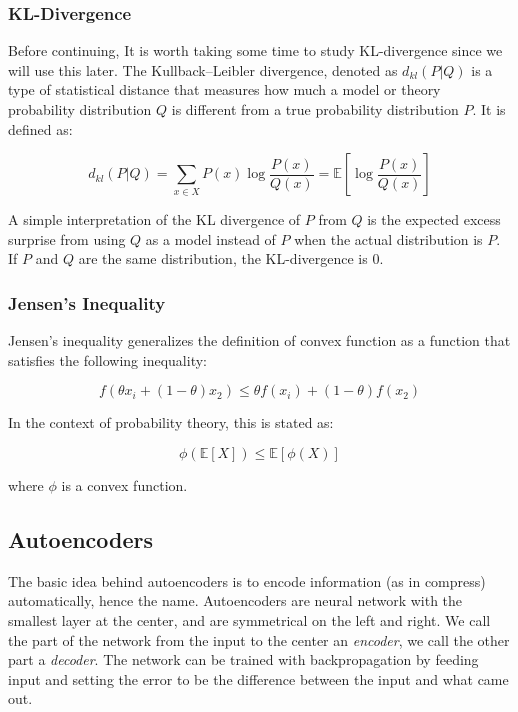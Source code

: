 \documentclass{article}
\begin{document}
\subsubsection{KL-Divergence}\label{kl-divergence}

Before continuing, It is worth taking some time to study KL-divergence
since we will use this later. The Kullback--Leibler divergence, denoted
as \(d_{kl}(P|Q)\) is a type of statistical distance that measures how
much a model or theory probability distribution \(Q\) is different from
a true probability distribution \(P\). It is defined as:

\[d_{kl}(P|Q)=\sum_{x\in X}P(x)\log \frac{P(x)}{Q(x)}=\mathbb{E}[\log \frac{P(x)}{Q(x)}]\]

A simple interpretation of the KL divergence of \(P\) from \(Q\) is the
expected excess surprise from using \(Q\) as a model instead of \(P\)
when the actual distribution is \(P\). If \(P\) and \(Q\) are the same
distribution, the KL-divergence is \(0\).

\subsubsection{Jensen's Inequality}\label{jensens-inequality}

Jensen's inequality generalizes the definition of convex function as a
function that satisfies the following inequality:

\[f(\theta x_i + (1-\theta)x_2) \le \theta f(x_i)+(1-\theta)f(x_2)\]

In the context of probability theory, this is stated as:

\[\phi(\mathbb{E}[X])\le \mathbb{E}[\phi(X)]\]

where \(\phi\) is a convex function.

\subsection{Autoencoders}\label{autoencoders}

The basic idea behind autoencoders is to encode information (as in
compress) automatically, hence the name. Autoencoders are neural network
with the smallest layer at the center, and are symmetrical on the left
and right. We call the part of the network from the input to the center
an \emph{encoder}, we call the other part a \emph{decoder}. The network
can be trained with backpropagation by feeding input and setting the
error to be the difference between the input and what came out.
\end{document}
